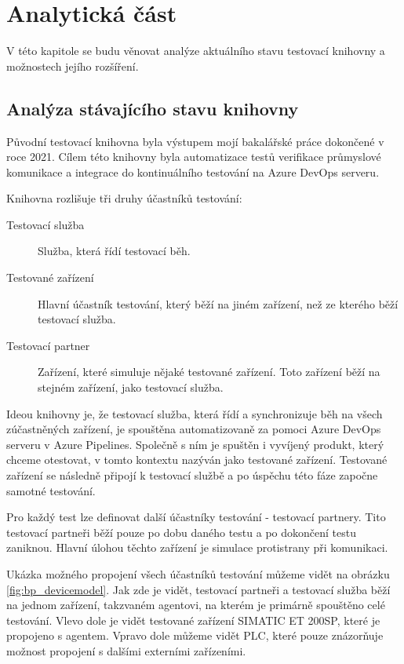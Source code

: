 \chapter{Analytická část}\label{chap:anal}

V této kapitole se budu věnovat analýze aktuálního stavu testovací knihovny a možnostech jejího rozšíření.


\section{Analýza stávajícího stavu knihovny}

Původní testovací knihovna byla výstupem mojí bakalářské práce\cite{bakalarka} dokončené v roce 2021. Cílem této knihovny byla automatizace testů verifikace průmyslové komunikace a integrace do kontinuálního testování na Azure DevOps serveru. 

Knihovna rozlišuje tři druhy účastníků testování:

\begin{description}
    \item[Testovací služba] Služba, která řídí testovací běh.
    \item[Testované zařízení] Hlavní účastník testování, který běží na jiném zařízení, než ze kterého běží testovací služba. 
    \item[Testovací partner] Zařízení, které simuluje nějaké testované zařízení. Toto zařízení běží na stejném zařízení, jako testovací služba. 
\end{description}

Ideou knihovny je, že testovací služba, která řídí a synchronizuje běh na všech zúčastněných zařízení, je spouštěna automatizovaně za pomoci Azure DevOps serveru v Azure Pipelines. Společně s ním je spuštěn i vyvíjený produkt, který chceme otestovat, v tomto kontextu nazýván jako testované zařízení. Testované zařízení se následně připojí k testovací službě a po úspěchu této fáze započne samotné testování. 

Pro každý test lze definovat další účastníky testování - testovací partnery. Tito testovací partneři běží pouze po dobu daného testu a po dokončení testu zaniknou. Hlavní úlohou těchto zařízení je simulace protistrany při komunikaci. 

Ukázka možného propojení všech účastníků testování můžeme vidět na obrázku \ref{fig:bp_devicemodel}. Jak zde je vidět, testovací partneři a testovací služba běží na jednom zařízení, takzvaném agentovi, na kterém je primárně spouštěno celé testování. Vlevo dole je vidět testované zařízení SIMATIC ET 200SP, které je propojeno s agentem. Vpravo dole můžeme vidět PLC, které pouze znázorňuje možnost propojení s dalšími externími zařízeními.

